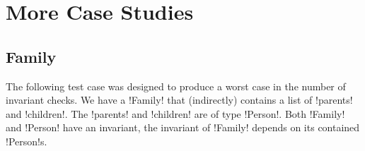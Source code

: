 

\section{More Case Studies}

\subsection{Family}
The following test case was designed to produce a worst case in the number of invariant checks. We have a \Q!Family! that (indirectly) contains a list of \Q!parents! and \Q!children!. The \Q!parents! and \Q!children! are of type \Q!Person!. Both \Q!Family! and \Q!Person! have an invariant, the invariant of \Q!Family! depends on its contained \Q!Person!s.


